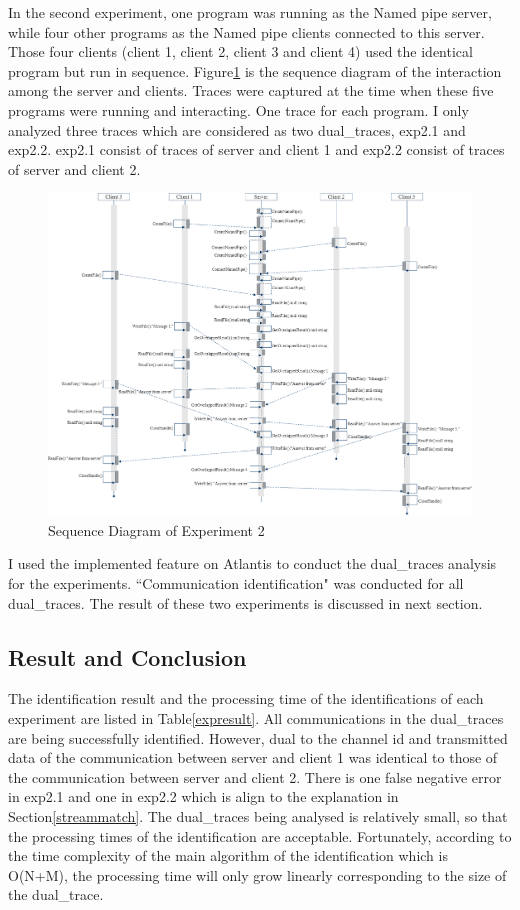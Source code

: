 In the second experiment, one program was running as the Named pipe server, while four other programs as the Named pipe clients connected to this server. Those four clients (client 1, client 2, client 3 and client 4) used the identical program but run in sequence. Figure\ref{exp2} is the sequence diagram of  the interaction among the server and clients. Traces were captured at the time when these five programs were running and interacting. One trace for each program. I only analyzed  three traces which are considered as two dual\_traces, exp2.1 and exp2.2. exp2.1 consist of traces of server and client 1 and exp2.2 consist of traces of server and client 2. 

\begin{figure}[H]
\centerline{\includegraphics[scale=0.4]{Figures/exp2}}
 \caption{Sequence Diagram of Experiment 2}
\label{exp2}
\end{figure}

I used the implemented feature on Atlantis to conduct the dual\_traces analysis for the experiments. ``Communication identification" was conducted for all dual\_traces. The result of these two experiments is discussed in next section. 

\subsection{Result and Conclusion}
The identification result and the processing time of the identifications of each experiment are listed in Table\ref{expresult}. All communications in the dual\_traces are being successfully identified. However, dual to the channel id and transmitted data of the communication between server and client 1 was identical to those of the communication  between server and client 2. There is one false negative error in exp2.1 and one in exp2.2 which is align to the explanation in Section\ref{streammatch}. The dual\_traces being analysed is relatively small, so that the processing times of the identification are acceptable. Fortunately, according to the time complexity of the main algorithm of the identification which is O(N+M), the processing time will only grow linearly corresponding to the size of the dual\_trace.

